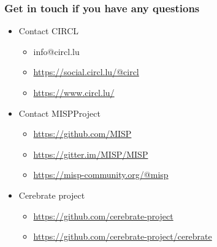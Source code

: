 \begin{frame}
  \frametitle{Get in touch if you have any questions}
  \begin{itemize}
    \item Contact CIRCL
    \begin{itemize}
      \item info@circl.lu
      \item \url{https://social.circl.lu/@circl}
      \item \url{https://www.circl.lu/}
    \end{itemize}
    \item Contact MISPProject 
    \begin{itemize}
      \item \url{https://github.com/MISP}
      \item \url{https://gitter.im/MISP/MISP}
      \item \url{https://misp-community.org/@misp}
    \end{itemize}
    \item Cerebrate project
    \begin{itemize}
      \item \url{https://github.com/cerebrate-project}
      \item \url{https://github.com/cerebrate-project/cerebrate}
    \end{itemize}
  \end{itemize}
\end{frame}

